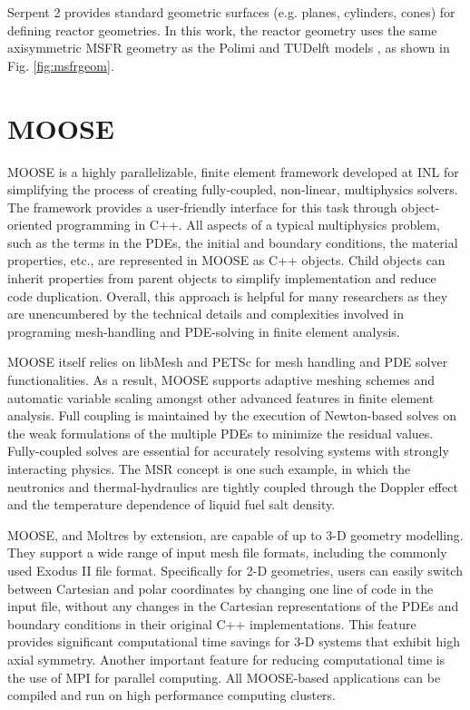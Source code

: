 Serpent 2 provides standard geometric surfaces (e.g. planes, cylinders, cones)
for defining reactor geometries. In this work, the reactor geometry uses the
same axisymmetric \gls{MSFR} geometry as the Polimi and TUDelft models
\cite{fiorina_modelling_2014}, as shown in Fig. \ref{fig:msfrgeom}.

\section{MOOSE}

\gls{MOOSE} \cite{gaston_physics-based_2015} is a highly parallelizable,
finite element framework developed at \gls{INL} for simplifying the process of
creating fully-coupled, non-linear, multiphysics solvers. The framework
provides a user-friendly interface for this task through object-oriented
programming in C++. All aspects of a typical multiphysics problem, such as the
terms in the \glspl{PDE}, the initial and boundary conditions, the material
properties, etc., are represented in \gls{MOOSE} as C++ objects. Child objects
can inherit properties from parent objects to simplify implementation and
reduce code duplication. Overall, this approach
is helpful for many researchers as they are unencumbered by the
technical details and complexities involved in programing mesh-handling
and \gls{PDE}-solving in finite element analysis.

\gls{MOOSE} itself relies on libMesh \cite{kirk_libmesh:_2006} and
PETSc \cite{satish_petsc_2019} for mesh handling and \gls{PDE} solver
functionalities. As a result, \gls{MOOSE} supports adaptive meshing schemes
and automatic variable scaling amongst other advanced features in finite
element analysis. Full
coupling is maintained by the execution of Newton-based solves on the
weak formulations of the multiple \glspl{PDE} to minimize the residual values.
Fully-coupled solves are essential for accurately resolving systems with
strongly interacting physics. The \gls{MSR} concept is one such example, in
which the neutronics and thermal-hydraulics are tightly coupled through the
Doppler effect and the temperature dependence of liquid fuel salt density.

\gls{MOOSE}, and Moltres by extension, are capable of up to 3-D geometry
modelling. They support a wide range of input mesh file formats, including the
commonly used Exodus II file format. Specifically for 2-D geometries, users
can easily switch between Cartesian and polar coordinates by changing one line
of code in the input file, without any changes in
the Cartesian representations of the \glspl{PDE} and boundary conditions in
their original C++ implementations. This feature provides significant
computational time savings for 3-D systems that exhibit high axial symmetry.
Another important feature for reducing computational time is the use of MPI
for parallel computing. All \gls{MOOSE}-based applications can be compiled and
run on high performance computing clusters.

